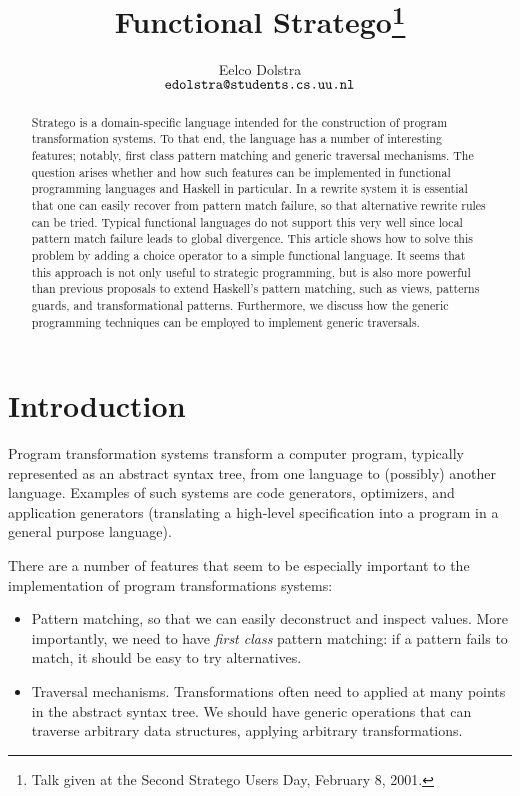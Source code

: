 \documentclass[fleqn]{article}
\newcommand{\ve}[1]{\ensuremath{\text{\tt #1}}}
\begin{document}

\title{Functional Stratego\footnote{Talk given at the Second Stratego
    Users Day, February 8, 2001.}}
\author{Eelco Dolstra \\
\ve{edolstra@students.cs.uu.nl}}
\maketitle


\begin{abstract}
Stratego is a domain-specific language intended for the construction
of program transformation systems.  To that end, the language has a
number of interesting features; notably, first class pattern matching
and generic traversal mechanisms.  The question arises whether and how such
features can be implemented in functional programming languages and
Haskell in particular.  In a rewrite system it is essential that one
can easily recover from pattern match failure, so that alternative
rewrite rules can be tried.  Typical functional languages do not
support this very well since local pattern match
failure leads to global divergence.  This article shows how to solve
this problem by adding a choice operator to a simple functional
language.  It seems that this approach is not only useful to strategic
programming, but is also more powerful than previous
proposals to extend Haskell's pattern matching, such as views,
patterns guards, and transformational patterns.  Furthermore, we
discuss how the generic programming techniques can be employed to
implement generic traversals.
\end{abstract}


\section{Introduction}

Program transformation systems transform a computer program, typically
represented as an abstract syntax tree, from one language to
(possibly) another language.  Examples of such systems are code
generators, optimizers, and application generators (translating a
high-level specification into a program in a general purpose
language).

There are a number of features that seem to be especially important to
the implementation of program transformations systems:
\begin{itemize}
\item Pattern matching, so that we can easily deconstruct and inspect
  values.  More importantly, we need to have {\em first class}
    pattern matching: if a pattern fails to match, it should be easy
    to try alternatives.
\item Traversal mechanisms.  Transformations often need to applied at
  many points in the abstract syntax tree.  We should have
  generic  operations that can traverse arbitrary data structures,
  applying arbitrary transformations.
\end{itemize}
\end{document}
